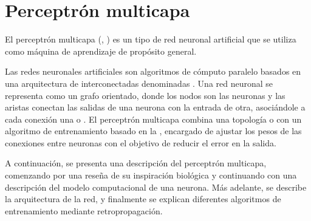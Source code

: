%
%
%
\section{Perceptrón multicapa}
%
El perceptrón multicapa (, )
\cite{mlp2,mlp1} es un tipo de red neuronal artificial que se utiliza
como máquina de aprendizaje de propósito general.

Las redes neuronales artificiales son algoritmos de
cómputo paralelo basados en una arquitectura de 
interconectadas denominadas .
Una red neuronal se representa como un grafo orientado, donde los
nodos son las neuronas y las aristas conectan las salidas de una
neurona con la entrada de otra, asociándole a cada conexión una
 o .
El perceptrón multicapa combina una topología  o  con un algoritmo de entrenamiento basado
en la , encargado de ajustar los pesos de las
conexiones entre neuronas con el objetivo de reducir el error en la
salida.

A continuación, se presenta una descripción del perceptrón multicapa,
comenzando por una reseña de su inspiración biológica y continuando
con una descripción del modelo computacional de una neurona.
Más adelante, se describe la arquitectura de la red, y finalmente se
explican diferentes algoritmos de entrenamiento mediante
retropropagación.
